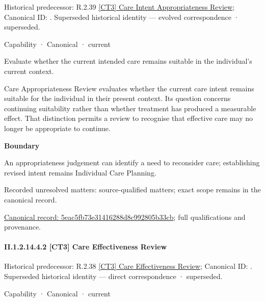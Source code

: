{\small Historical predecessor: R.2.39 \hyperref[element:905eb2de1ac341ac96331e3d7f76079b]{[CT3] Care Intent Appropriateness Review}; Canonical ID: \texttt{}. Superseded historical identity — evolved correspondence · superseded.}\par
\label{element:5eac5fb73e31416288d8c992805b33cb}
{\small Capability · Canonical · current}\par

Evaluate whether the current intended care remains suitable in the individual’s current context.



Care Appropriateness Review evaluates whether the current care intent remains suitable for the individual in their present context. Its question concerns continuing suitability rather than whether treatment has produced a measurable effect. That distinction permits a review to recognise that effective care may no longer be appropriate to continue.



\textbf{Boundary}



An appropriateness judgement can identify a need to reconsider care; establishing revised intent remains Individual Care Planning.


{\small Recorded unresolved matters: source-qualified matters; exact scope remains in the canonical record.}\par
{\footnotesize \href{../../../../continuum/strategy/capability/5eac5fb73e31416288d8c992805b33cb.md}{Canonical record: 5eac5fb73e31416288d8c992805b33cb}; full qualifications and provenance.}\par
\paragraph*{II.1.2.14.4.2 [CT3] Care Effectiveness Review}
\label{navigation:II.1.2.14.4.2}

{\small Historical predecessor: R.2.38 \hyperref[element:31f49cdea9f44f188459503580c2b86e]{[CT3] Care Effectiveness Review}; Canonical ID: \texttt{}. Superseded historical identity — direct correspondence · superseded.}\par
\label{element:79cfeaefeb174a54ba43343d37f035c1}
{\small Capability · Canonical · current}\par

